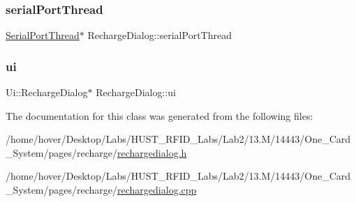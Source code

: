 \mbox{\label{class_recharge_dialog_a9d33c6c98810ddf8958e6055aa6664af}} 
\subsubsection{\texorpdfstring{serialPortThread}{serialPortThread}}
{\footnotesize\ttfamily \mbox{\hyperlink{class_serial_port_thread}{Serial\+Port\+Thread}}$\ast$ Recharge\+Dialog\+::serial\+Port\+Thread\hspace{0.3cm}{\ttfamily [private]}}

\mbox{\label{class_recharge_dialog_ab496c91dc8ba4fcc23c21e9f372af5a9}} 
\subsubsection{\texorpdfstring{ui}{ui}}
{\footnotesize\ttfamily Ui\+::\+Recharge\+Dialog$\ast$ Recharge\+Dialog\+::ui\hspace{0.3cm}{\ttfamily [private]}}



The documentation for this class was generated from the following files\+:\begin{DoxyCompactItemize}
\item 
/home/hover/\+Desktop/\+Labs/\+H\+U\+S\+T\+\_\+\+R\+F\+I\+D\+\_\+\+Labs/\+Lab2/13.\+M/14443/\+One\+\_\+\+Card\+\_\+\+System/pages/recharge/\mbox{\hyperlink{rechargedialog_8h}{rechargedialog.\+h}}\item 
/home/hover/\+Desktop/\+Labs/\+H\+U\+S\+T\+\_\+\+R\+F\+I\+D\+\_\+\+Labs/\+Lab2/13.\+M/14443/\+One\+\_\+\+Card\+\_\+\+System/pages/recharge/\mbox{\hyperlink{rechargedialog_8cpp}{rechargedialog.\+cpp}}\end{DoxyCompactItemize}
